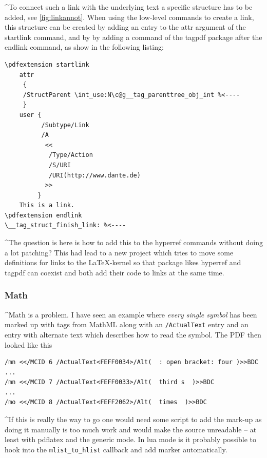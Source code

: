 \documentclass[DIV=12,parskip=half-,bibliography=totoc]{scrartcl}
\newcommand\PDF{PDF}
\begin{document}
\TagP^To connect such a link with the underlying text a specific structure has to be added, see \ref{fig:linkannot}. When using the low-level commands to create a link, this structure can be created by adding an entry to the attr argument of the startlink command, and by by adding a command of the tagpdf package after the endlink command, as show in the following listing:\TagPend

\begin{lstlisting}
\pdfextension startlink
    attr
     {
     /StructParent \int_use:N\c@g__tag_parenttree_obj_int %<----
     }
    user {
          /Subtype/Link
          /A
           <<
            /Type/Action
            /S/URI
            /URI(http://www.dante.de)
           >>
         }
    This is a link.
\pdfextension endlink
\__tag_struct_finish_link: %<----
\end{lstlisting}
\tagmcend\tagstructend

\TagP^The question is here is how to add this to the hyperref commands without doing a lot patching? This had lead to a new project which tries to move some definitions for links to the \LaTeX-kernel so that package likes hyperref and tagpdf can coexist and both add their code to links at the same time.\TagPend

\subsubsection{Math}

\TagP^Math is a problem. I have seen an example where \emph{every single symbol} has been marked up with tags from MathML along with an \texttt{/ActualText} entry and an entry with alternate text which describes how to read the symbol.
The \PDF{} then looked like this\TagPend

\begin{lstlisting}
/mn <</MCID 6 /ActualText<FEFF0034>/Alt(  : open bracket: four )>>BDC
...
/mn <</MCID 7 /ActualText<FEFF0033>/Alt(  third s  )>>BDC
...
/mo <</MCID 8 /ActualText<FEFF2062>/Alt(  times  )>>BDC
\end{lstlisting}
\tagmcend\tagstructend


\TagP^If this is really the way to go one would need some script to add the mark-up as doing it manually is too much work and would make the source unreadable -- at least with pdflatex and the generic mode. In lua mode is it probably possible to hook into the \texttt{mlist\_to\_hlist} callback and add marker automatically.\TagPend
\end{document}
